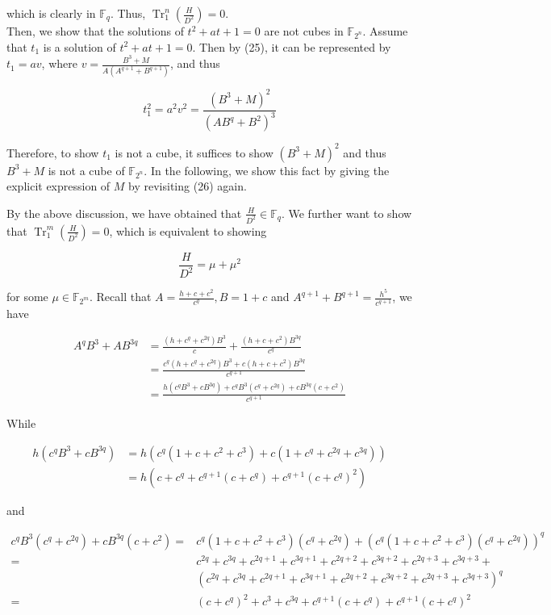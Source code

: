 \documentclass[10pt]{article}
\begin{document}
which is clearly in $\mathbb{F}_{q}$. Thus, $\operatorname{Tr}_{1}^{n}\left(\frac{H}{D^{2}}\right)=0$.\\
Then, we show that the solutions of $t^{2}+a t+1=0$ are not cubes in $\mathbb{F}_{2^{n}}$. Assume that $t_{1}$ is a solution of $t^{2}+a t+1=0$. Then by (25), it can be represented by $t_{1}=a v$, where $v=\frac{B^{3}+M}{A\left(A^{q+1}+B^{q+1}\right)}$, and thus

$$
t_{1}^{2}=a^{2} v^{2}=\frac{\left(B^{3}+M\right)^{2}}{\left(A B^{q}+B^{2}\right)^{3}}
$$

Therefore, to show $t_{1}$ is not a cube, it suffices to show $\left(B^{3}+M\right)^{2}$ and thus $B^{3}+M$ is not a cube of $\mathbb{F}_{2^{n}}$. In the following, we show this fact by giving the explicit expression of $M$ by revisiting (26) again.

By the above discussion, we have obtained that $\frac{H}{D^{2}} \in \mathbb{F}_{q}$. We further want to show that $\operatorname{Tr}_{1}^{m}\left(\frac{H}{D^{2}}\right)=0$, which is equivalent to showing


\begin{equation*}
\frac{H}{D^{2}}=\mu+\mu^{2} \tag{27}
\end{equation*}


for some $\mu \in \mathbb{F}_{2^{m}}$. Recall that $A=\frac{h+c+c^{2}}{c^{q}}, B=1+c$ and $A^{q+1}+B^{q+1}=\frac{h^{5}}{c^{q+1}}$, we have

$$
\begin{aligned}
A^{q} B^{3}+A B^{3 q} & =\frac{\left(h+c^{q}+c^{2 q}\right) B^{3}}{c}+\frac{\left(h+c+c^{2}\right) B^{3 q}}{c^{q}} \\
& =\frac{c^{q}\left(h+c^{q}+c^{2 q}\right) B^{3}+c\left(h+c+c^{2}\right) B^{3 q}}{c^{q+1}} \\
& =\frac{h\left(c^{q} B^{3}+c B^{3 q}\right)+c^{q} B^{3}\left(c^{q}+c^{2 q}\right)+c B^{3 q}\left(c+c^{2}\right)}{c^{q+1}}
\end{aligned}
$$

While

$$
\begin{aligned}
h\left(c^{q} B^{3}+c B^{3 q}\right) & =h\left(c^{q}\left(1+c+c^{2}+c^{3}\right)+c\left(1+c^{q}+c^{2 q}+c^{3 q}\right)\right) \\
& =h\left(c+c^{q}+c^{q+1}\left(c+c^{q}\right)+c^{q+1}\left(c+c^{q}\right)^{2}\right)
\end{aligned}
$$

and

$$
\begin{aligned}
c^{q} B^{3}\left(c^{q}+c^{2 q}\right)+c B^{3 q}\left(c+c^{2}\right)= & c^{q}\left(1+c+c^{2}+c^{3}\right)\left(c^{q}+c^{2 q}\right)+\left(c^{q}\left(1+c+c^{2}+c^{3}\right)\left(c^{q}+c^{2 q}\right)\right)^{q} \\
= & c^{2 q}+c^{3 q}+c^{2 q+1}+c^{3 q+1}+c^{2 q+2}+c^{3 q+2}+c^{2 q+3}+c^{3 q+3}+ \\
& \left(c^{2 q}+c^{3 q}+c^{2 q+1}+c^{3 q+1}+c^{2 q+2}+c^{3 q+2}+c^{2 q+3}+c^{3 q+3}\right)^{q} \\
= & \left(c+c^{q}\right)^{2}+c^{3}+c^{3 q}+c^{q+1}\left(c+c^{q}\right)+c^{q+1}\left(c+c^{q}\right)^{2}
\end{aligned}
$$
\end{document}
